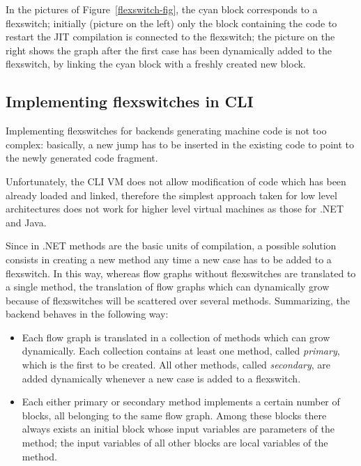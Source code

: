 In the pictures of Figure~\ref{flexswitch-fig}, the cyan block
corresponds to a flexswitch; initially (picture on the left) 
only the block containing the code to restart the JIT compilation
is connected to the flexswitch; the picture on the right
shows the graph after the first case has been dynamically added to the flexswitch,
by linking the cyan block with a freshly created new block.


\subsection{Implementing flexswitches in CLI}

Implementing flexswitches for backends generating machine code is
not too complex: basically, a new jump has to be inserted in the
existing code to point to the newly generated code fragment.

Unfortunately, the CLI VM does not allow modification of code which
has been already loaded and linked, therefore the simplest approach
taken for low level architectures does not work for higher level 
virtual machines as those for .NET and Java.

Since in .NET methods are the basic units of compilation, a possible
solution consists in creating a new method 
any time a new case has to be added to a flexswitch.
In this way, whereas flow graphs without flexswitches are translated
to a single method, the translation of flow graphs which can dynamically grow because of
flexswitches will be scattered over several methods.
Summarizing, the backend behaves in the following way:
\begin{itemize}
\item Each flow graph is translated in a collection of methods which
  can grow dynamically.  Each collection contains at least one
  method, called \emph{primary}, which is the first to be created.
  All other methods, called \emph{secondary}, are added dynamically 
  whenever a new case is added to a flexswitch.

\item Each either primary or secondary method implements a certain
  number of blocks, all belonging to the same flow graph. Among these blocks
  there always exists an initial block whose input variables are
  parameters of the method; the input variables of all other blocks
  are local variables of the method.
\end{itemize} 

